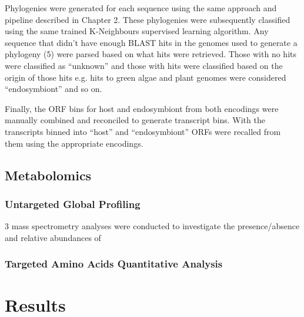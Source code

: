 Phylogenies were generated for each sequence using the same approach and pipeline
described in Chapter 2. These phylogenies were subsequently classified using the 
same trained K-Neighbours supervised learning algorithm.
Any sequence that didn't have enough BLAST hits in the genomes used to generate
a phylogeny (5) were parsed based on what hits were retrieved.
Those with no hits were classified as ``unknown'' and those with
hits were classified based on the origin of those hits e.g. hits
to green algae and plant genomes were considered ``endosymbiont'' and so on.

Finally, the ORF bins for host and endosymbiont 
from both encodings were manually combined and reconciled
to generate transcript bins.  With the transcripts binned into
``host'' and ``endosymbiont'' ORFs were recalled from them using the appropriate
encodings. 


\subsection{Metabolomics}

\subsubsection{Untargeted Global Profiling}

3 mass spectrometry analyses were conducted to investigate the presence/absence
and relative abundances of 


\subsubsection{Targeted Amino Acids Quantitative Analysis}



\section{Results}
